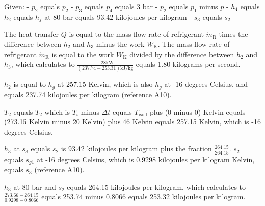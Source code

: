 Given:
- \( p_2 \) equals \( p_2 \)
- \( p_3 \) equals \( p_4 \) equals 3 bar
- \( p_2 \) equals \( p_1 \) minus \( p \)
- \( h_4 \) equals \( h_2 \) equals \( h_f \) at 80 bar equals 93.42 kilojoules per kilogram
- \( s_3 \) equals \( s_2 \)

The heat transfer \( Q \) is equal to the mass flow rate of refrigerant \( \dot{m}_{\text{R}} \) times the difference between \( h_2 \) and \( h_3 \) minus the work \( \dot{W}_{\text{K}} \). The mass flow rate of refrigerant \( \dot{m}_{\text{R}} \) is equal to the work \( \dot{W}_{\text{K}} \) divided by the difference between \( h_2 \) and \( h_3 \), which calculates to \( \frac{-28 \text{kW}}{(237.74 - 253.31) \text{kJ/kg}} \) equals 1.80 kilograms per second.

\( h_2 \) is equal to \( h_g \) at 257.15 Kelvin, which is also \( h_g \) at -16 degrees Celsius, and equals 237.74 kilojoules per kilogram (reference A10).

\( T_2 \) equals \( T_2 \) which is \( T_i \) minus \( \Delta t \) equals \( T_{\text{isoll}} \) plus (0 minus 0) Kelvin equals (273.15 Kelvin minus 20 Kelvin) plus 46 Kelvin equals 257.15 Kelvin, which is -16 degrees Celsius.

\( h_3 \) at \( s_3 \) equals \( s_2 \) is 93.42 kilojoules per kilogram plus the fraction \( \frac{264.15}{264.15} \).
\( s_2 \) equals \( s_{g1} \) at -16 degrees Celsius, which is 0.9298 kilojoules per kilogram Kelvin, equals \( s_3 \) (reference A10).

\( h_3 \) at 80 bar and \( s_2 \) equals 264.15 kilojoules per kilogram, which calculates to \( \frac{273.66 - 264.15}{0.9298 - 0.8066} \) equals 253.74 minus 0.8066 equals 253.32 kilojoules per kilogram.